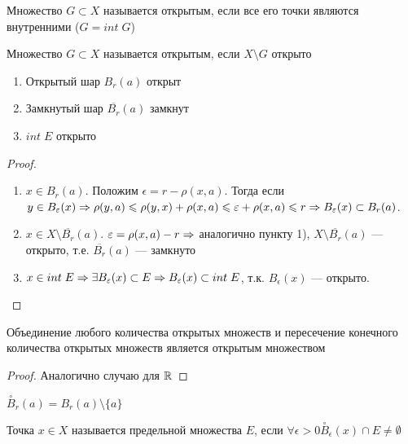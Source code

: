 \begin{definition}
    Множество \(G\subset X\) называется открытым, если все его точки являются внутренними (\(G = int\;G\))
\end{definition}
\begin{definition}
    Множество \(G\subset X\) называется открытым, если \(X\setminus G\) открыто
\end{definition}
\begin{proposition}\indent
    \begin{enumerate}
        \item Открытый шар \(B_r(a)\) открыт
        \item Замкнутый шар \(\overline{B_r}(a)\) замкнут
        \item \(int\;E\) открыто
    \end{enumerate}
\end{proposition}
\begin{proof}\indent
    \begin{enumerate}
        \item \(x \in B_r(a)\). Положим \(\epsilon = r - \rho(x, a)\). Тогда если \(y \in B_{\varepsilon}(x) \Rightarrow \rho(y, a) \leqslant \rho(y, x) + \rho(x, a) \leqslant \varepsilon + \rho(x, a) \leqslant r \Rightarrow B_{\varepsilon}(x) \subset B_r(a)\).
        \item \(x \in X \setminus \overline{B_r}(a)\). \(\varepsilon = \rho(x, a) - r\Rightarrow\) аналогично пункту 1), \(X \setminus \overline{B_r}(a)\) --- открыто, т.е. \(\overline{B_r}(a)\) --- замкнуто
        \item \(x \in int\;E \Rightarrow \exists B_{\varepsilon}(x) \subset E \Rightarrow B_{\varepsilon}(x) \subset int\;E\), т.к. \(B_\epsilon(x)\) --- открыто.
    \end{enumerate}
\end{proof}

\begin{lemma}
    Объединение любого количества открытых множеств и пересечение конечного количества открытых множеств является открытым множеством
\end{lemma}
\begin{proof}
    Аналогично случаю для \(\mathbb{R}\)
\end{proof}

\begin{definition}
    \(\stackrel{\circ}{B}_r(a) = B_r(a) \setminus \{a\}\)
\end{definition}

\begin{definition}
    Точка \(x \in X\) называется предельной множества \(E\), если \(\forall \epsilon > 0 \stackrel{\circ}{B}_\epsilon(x) \cap E \ne \emptyset\)
\end{definition}

